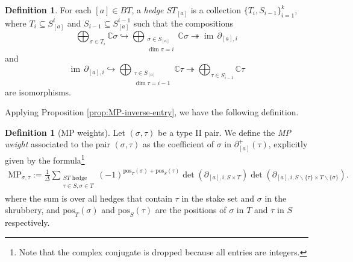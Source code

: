\documentclass[11pt,reqno]{amsart}
\def\im {{\operatorname{im}}}
\def\C {{\mathbb C}}
\theoremstyle{definition}
\newtheorem{definition}[theorem]{Definition}
\numberwithin{equation}{section}
\begin{document}
\smallskip

\begin{definition}
    For each $[a]\in BT$, a \textit{hedge} $ST_{[a]}$ is a collection $\{T_i, S_{i-1}\}_{i=1}^k$, where $T_i \subseteq S_{[a]}^i$ and $S_{i-1} \subseteq S_{[a]}^{i-1}$ such that the compositions
$$ \bigoplus_{\sigma\in T_i}\C\sigma \hookrightarrow \bigoplus_{\substack{\sigma\in S_{[a]} \\ \dim\sigma = i}} \C\sigma \twoheadrightarrow \im\,\partial_{[a],i}$$
and
$$ \im\,\partial_{[a],i}\hookrightarrow \bigoplus_{\substack{\tau\in S_{[a]} \\ \dim\tau = i-1}} \C\tau \twoheadrightarrow \bigoplus_{\tau\in S_{i-1} }\C\tau  $$
are isomorphisms.
\end{definition}

Applying Proposition \ref{prop:MP-inverse-entry}, we have the following definition.

\begin{definition}[MP weights]\label{def:MP-weights}
    Let $(\sigma,\tau)$ be a type II pair. We define the \textit{MP weight} associated to the pair $(\sigma,\tau)$ as the coefficient of $\sigma$ in $\partial_{[a]}^+(\tau)$, explicitly given by the formula\footnote{Note that the complex conjugate is dropped because all entries are integers.}
    \begin{align*}
    \mathrm{MP}_{\sigma,\tau}:=\frac{1}{\Delta}\sum_{\substack{ ST \text{ hedge} \\ \tau\in S, \sigma\in T}} (-1)^{\mathrm{pos}_T(\sigma)+\mathrm{pos}_S(\tau)} \det(\partial_{[a],i,S\times T})\det(\partial_{[a],i,S\backslash\{\tau\}\times T\backslash\{\sigma\}}).
\end{align*}
where the sum is over all hedges that contain $\tau$ in the stake set and $\sigma$ in the shrubbery, and $\mathrm{pos}_T(\sigma)$ and $\mathrm{pos}_S(\tau)$ are the positions of $\sigma$ in $T$ and $\tau$ in $S$ respectively.
\end{definition}
\end{document}
